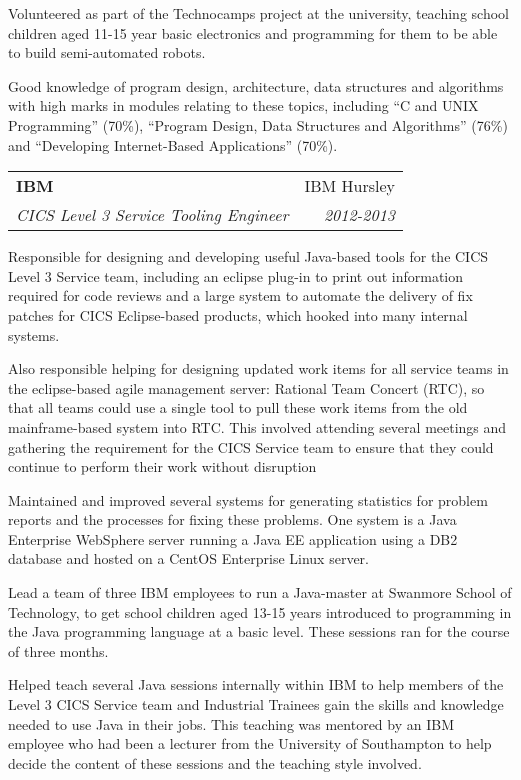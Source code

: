 \documentclass[letterpaper,11pt]{article}
\makeatletter
\newlength{\outerbordwidth}
\newcommand{\resheading}[1]{\vspace{8pt}
  \parbox{\textwidth}{\setlength{\FrameSep}{\outerbordwidth}
    \begin{shaded}
\setlength{\fboxsep}{0pt}\framebox[\textwidth][l]{\setlength{\fboxsep}{4pt}\fcolorbox{shadecolorB}{shadecolorB}{\textbf{\sffamily{\mbox{~}\makebox[6.762in][l]{\large #1} \vphantom{p\^{E}}}}}}
    \end{shaded}
  }\vspace{-5pt}
}
\newcommand{\ressubheading}[4]{
\begin{tabular*}{6.5in}{l@{\cftdotfill{\cftsecdotsep}\extracolsep{\fill}}r}
		\textbf{#1} & #2 \\
		\textit{#3} & \textit{#4} \\
\end{tabular*}\vspace{-6pt}}
\makeatother
\begin{document}
Volunteered as part of the Technocamps project at the university, teaching school children aged 11-15 year basic electronics and programming for them to be able to build semi-automated robots.

Good knowledge of program design, architecture, data structures and algorithms with high marks in modules relating to these topics, including ``C and UNIX Programming'' (70\%), ``Program Design, Data Structures and Algorithms'' (76\%) and ``Developing Internet-Based Applications'' (70\%).




\resheading{Work Experience}
\ressubheading{IBM}{IBM Hursley}{CICS Level 3 Service Tooling Engineer}{2012-2013}
\vspace{10pt}

Responsible for designing and developing useful Java-based tools for the CICS Level 3 Service team, including an eclipse plug-in to print out information required for code reviews and a large system to automate the delivery of fix patches for CICS Eclipse-based products, which hooked into many internal systems.

Also responsible helping for designing updated work items for all service teams in the eclipse-based agile management server: Rational Team Concert (RTC), so that all teams could use a single tool to pull these work items from the old mainframe-based system into RTC. This involved attending several meetings and gathering the requirement for the CICS Service team to ensure that they could continue to perform their work without disruption

Maintained and improved several systems for generating statistics for problem reports and the processes for fixing these problems. One system is a Java Enterprise WebSphere server running a Java EE application using a DB2 database and hosted on a CentOS Enterprise Linux server.

Lead a team of three IBM employees to run a Java-master at Swanmore School of Technology, to get school children aged 13-15 years introduced to programming in the Java programming language at a basic level. These sessions ran for the course of three months.

Helped teach several Java sessions internally within IBM to help members of the Level 3 CICS Service team and Industrial Trainees gain the skills and knowledge needed to use Java in their jobs. This teaching was mentored by an IBM employee who had been a lecturer from the University of Southampton to help decide the content of these sessions and the teaching style involved.
\end{document}
